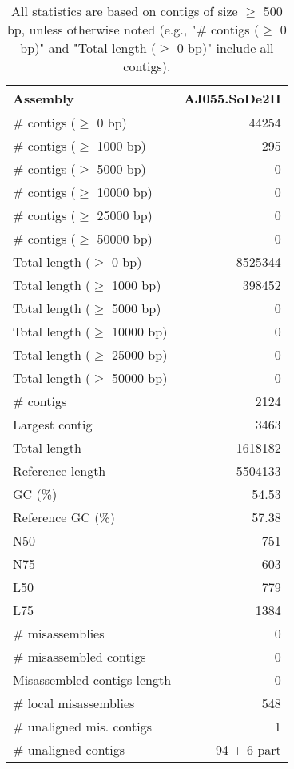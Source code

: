 \documentclass[12pt,a4paper]{article}
\begin{document}
\begin{table}[ht]
\begin{center}
\caption{All statistics are based on contigs of size $\geq$ 500 bp, unless otherwise noted (e.g., "\# contigs ($\geq$ 0 bp)" and "Total length ($\geq$ 0 bp)" include all contigs).}
\begin{tabular}{|l*{1}{|r}|}
\hline
Assembly & AJ055.SoDe2H \\ \hline
\# contigs ($\geq$ 0 bp) & 44254 \\ \hline
\# contigs ($\geq$ 1000 bp) & 295 \\ \hline
\# contigs ($\geq$ 5000 bp) & 0 \\ \hline
\# contigs ($\geq$ 10000 bp) & 0 \\ \hline
\# contigs ($\geq$ 25000 bp) & 0 \\ \hline
\# contigs ($\geq$ 50000 bp) & 0 \\ \hline
Total length ($\geq$ 0 bp) & 8525344 \\ \hline
Total length ($\geq$ 1000 bp) & 398452 \\ \hline
Total length ($\geq$ 5000 bp) & 0 \\ \hline
Total length ($\geq$ 10000 bp) & 0 \\ \hline
Total length ($\geq$ 25000 bp) & 0 \\ \hline
Total length ($\geq$ 50000 bp) & 0 \\ \hline
\# contigs & 2124 \\ \hline
Largest contig & 3463 \\ \hline
Total length & 1618182 \\ \hline
Reference length & 5504133 \\ \hline
GC (\%) & 54.53 \\ \hline
Reference GC (\%) & 57.38 \\ \hline
N50 & 751 \\ \hline
N75 & 603 \\ \hline
L50 & 779 \\ \hline
L75 & 1384 \\ \hline
\# misassemblies & 0 \\ \hline
\# misassembled contigs & 0 \\ \hline
Misassembled contigs length & 0 \\ \hline
\# local misassemblies & 548 \\ \hline
\# unaligned mis. contigs & 1 \\ \hline
\# unaligned contigs & 94 + 6 part \\ \hline

\end{tabular}
\end{center}
\end{table}
\end{document}
